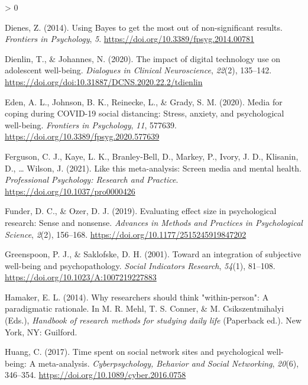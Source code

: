 \documentclass[
  english,
  man,floatsintext]{apa6}
\newlength{\cslhangindent}
\newenvironment{CSLReferences}[2] %
 {%
  \setlength{\parindent}{0pt}
  \ifodd #1 \everypar{\setlength{\hangindent}{\cslhangindent}}\ignorespaces\fi
  \ifnum #2 > 0
  \setlength{\parskip}{#2\baselineskip}
  \fi
 }%
 {}
\begin{document}
\begin{CSLReferences}{1}{0}
\leavevmode\hypertarget{ref-dienesUsingBayesGet2014}{}%
Dienes, Z. (2014). Using {Bayes} to get the most out of non-significant results. \emph{Frontiers in Psychology}, \emph{5}. \url{https://doi.org/10.3389/fpsyg.2014.00781}

\leavevmode\hypertarget{ref-dienlinImpactDigitalTechnology2020}{}%
Dienlin, T., \& Johannes, N. (2020). The impact of digital technology use on adolescent well-being. \emph{Dialogues in Clinical Neuroscience}, \emph{22}(2), 135--142. \url{https://doi.org/doi:10.31887/DCNS.2020.22.2/tdienlin}

\leavevmode\hypertarget{ref-edenMediaCopingCOVID192020}{}%
Eden, A. L., Johnson, B. K., Reinecke, L., \& Grady, S. M. (2020). Media for coping during {COVID}-19 social distancing: {Stress}, anxiety, and psychological well-being. \emph{Frontiers in Psychology}, \emph{11}, 577639. \url{https://doi.org/10.3389/fpsyg.2020.577639}

\leavevmode\hypertarget{ref-fergusonThisMetaanalysisScreen2021}{}%
Ferguson, C. J., Kaye, L. K., Branley-Bell, D., Markey, P., Ivory, J. D., Klisanin, D., \ldots{} Wilson, J. (2021). Like this meta-analysis: {Screen} media and mental health. \emph{Professional Psychology: Research and Practice}. \url{https://doi.org/10.1037/pro0000426}

\leavevmode\hypertarget{ref-funderEvaluatingEffectSize2019}{}%
Funder, D. C., \& Ozer, D. J. (2019). Evaluating effect size in psychological research: {Sense} and nonsense. \emph{Advances in Methods and Practices in Psychological Science}, \emph{2}(2), 156--168. \url{https://doi.org/10.1177/2515245919847202}

\leavevmode\hypertarget{ref-greenspoonIntegrationSubjectiveWellbeing2001}{}%
Greenspoon, P. J., \& Saklofske, D. H. (2001). Toward an integration of subjective well-being and psychopathology. \emph{Social Indicators Research}, \emph{54}(1), 81--108. \url{https://doi.org/10.1023/A:1007219227883}

\leavevmode\hypertarget{ref-hamakerWhyResearchersShould2014}{}%
Hamaker, E. L. (2014). Why researchers should think "within-person": {A} paradigmatic rationale. In M. R. Mehl, T. S. Conner, \& M. Csikszentmihalyi (Eds.), \emph{Handbook of research methods for studying daily life} (Paperback ed.). New York, NY: Guilford.

\leavevmode\hypertarget{ref-huangTimeSpentSocial2017}{}%
Huang, C. (2017). Time spent on social network sites and psychological well-being: {A} meta-analysis. \emph{Cyberpsychology, Behavior and Social Networking}, \emph{20}(6), 346--354. \url{https://doi.org/10.1089/cyber.2016.0758}


\end{CSLReferences}
\end{document}
